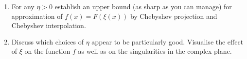 \begin{exercise}
\begin{enumerate}
      \begin{enumerate} \alist 
         \item For any $\eta > 0$ establish an upper bound (as sharp as you can
         manage) for approximation of $f(x) = F(\xi(x))$ by Chebyshev projection
         and Chebyshev interpolation.
         
         \item Discuss which choices of $\eta$ appear to be particularly good.
         Visualise the effect of $\xi$ on the function $f$ as well as on 
         the singularities in the complex plane.
      \end{enumerate}
   \end{enumerate}
\end{exercise}

